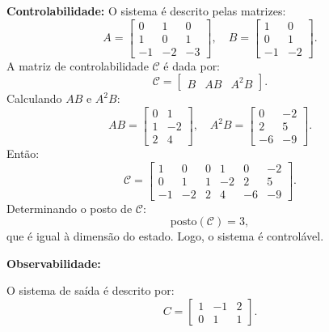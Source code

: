 \begin{resolution}
  {\bf Controlabilidade:} O sistema é descrito pelas matrizes:
  \[
    A =
    \begin{bmatrix}
      0  & 1  & 0  \\
      1  & 0  & 1  \\
      -1 & -2 & -3
    \end{bmatrix}, \quad
    B =
    \begin{bmatrix}
      1  & 0  \\
      0  & 1  \\
      -1 & -2
    \end{bmatrix}.
  \]
  A matriz de controlabilidade \( \mathcal{C} \) é dada por:
  \[
    \mathcal{C} = \begin{bmatrix} B & AB & A^2B \end{bmatrix}.
  \]
  Calculando \( AB \) e \( A^2B \):
  \[
    AB =
    \begin{bmatrix}
      0 & 1  \\
      1 & -2 \\
      2 & 4
    \end{bmatrix}, \quad
    A^2B =
    \begin{bmatrix}
      0  & -2 \\
      2  & 5  \\
      -6 & -9
    \end{bmatrix}.
  \]
  Então:
  \[
    \mathcal{C} =
    \begin{bmatrix}
      1  & 0  & 0 & 1  & 0  & -2 \\
      0  & 1  & 1 & -2 & 2  & 5  \\
      -1 & -2 & 2 & 4  & -6 & -9
    \end{bmatrix}.
  \]
  Determinando o posto de \( \mathcal{C} \):
  \[
    \text{posto}(\mathcal{C}) = 3,
  \]
  que é igual à dimensão do estado. Logo, o sistema é controlável.

  {\bf Observabilidade:}

  O sistema de saída é descrito por:
  \[
    C =
    \begin{bmatrix}
      1 & -1 & 2 \\
      0 & 1  & 1
    \end{bmatrix}.
  \]


\end{resolution}
